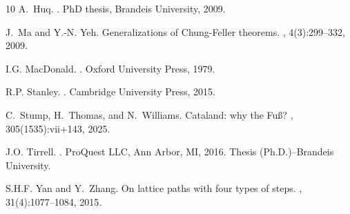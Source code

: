 \documentclass[11pt]{article}
\theoremstyle{definition} %
\numberwithin{equation}{section}
\begin{document}
\begin{thebibliography}{10}
A.~Huq.
.
\newblock PhD thesis, Brandeis University, 2009.

J.~Ma and Y.-N. Yeh.
\newblock Generalizations of {C}hung-{F}eller theorems.
, 4(3):299--332, 2009.

I.G. MacDonald.
.
\newblock Oxford University Press, 1979.

R.P. Stanley.
.
\newblock Cambridge University Press, 2015.

C.~Stump, H.~Thomas, and N.~Williams.
\newblock Cataland: why the {F}u{\ss}?
, 305(1535):vii+143, 2025.

J.O. Tirrell.
.
\newblock ProQuest LLC, Ann Arbor, MI, 2016.
\newblock Thesis (Ph.D.)--Brandeis University.

S.H.F. Yan and Y.~Zhang.
\newblock On lattice paths with four types of steps.
, 31(4):1077--1084, 2015.

\end{thebibliography}
    
\end{document}

